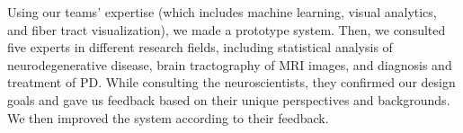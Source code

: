 Using our teams' expertise (which includes machine learning, visual analytics, and fiber tract visualization), we made a prototype system.
Then, we consulted five experts in different research fields, including statistical analysis of neurodegenerative disease, brain tractography of MRI images, and diagnosis and treatment of PD. While consulting the neuroscientists, they confirmed our design goals and gave us feedback based on their unique perspectives and backgrounds. We then improved the system according to their feedback. 



	
	
	
